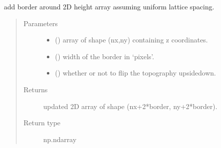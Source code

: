 \documentclass[letterpaper,10pt,english]{sphinxmanual}
\begin{document}
\begin{fulllineitems}
\label{\detokenize{stlutils:stlutils.add_border}}
\sphinxAtStartPar
add border around 2D height array assuming uniform lattice spacing.
\begin{quote}\begin{description}
\item[{Parameters}] \leavevmode\begin{itemize}
\item {} 
\sphinxAtStartPar
{} () \textendash{} array of shape (nx,ny) containing z coordinates.

\item {} 
\sphinxAtStartPar
{} () \textendash{} width of the border in ‘pixels’.

\item {} 
\sphinxAtStartPar
{} () \textendash{} whether or not to flip the topography upside\sphinxhyphen{}down.

\end{itemize}

\item[{Returns}] \leavevmode
\sphinxAtStartPar
updated 2D array of shape (nx+2*border, ny+2*border).

\item[{Return type}] \leavevmode
\sphinxAtStartPar
np.ndarray

\end{description}\end{quote}

\end{fulllineitems}

\end{document}
